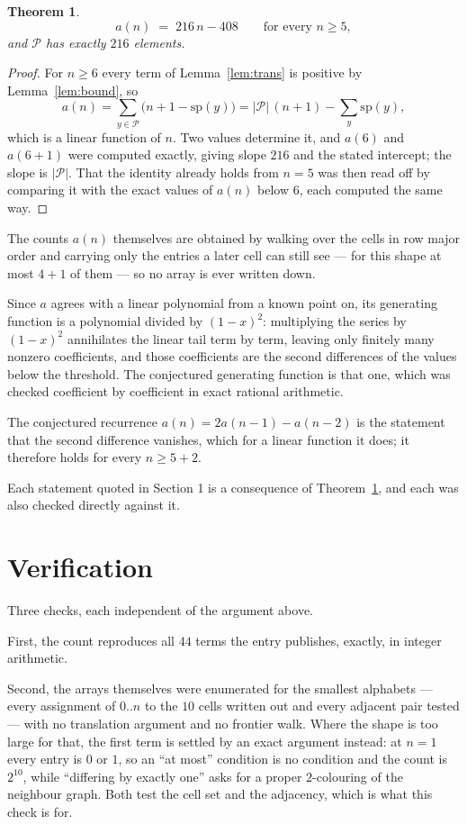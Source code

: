 \documentclass[11pt,a4paper]{article}
\theoremstyle{plain}
\newtheorem{theorem}{Theorem}
\theoremstyle{definition}
\begin{document}
\begin{theorem}\label{thm:line}
\[
a(n)\;=\;216\,n-408\qquad\text{for every }n\ge5,
\]
and $\mathcal P$ has exactly $216$ elements.
\end{theorem}

\begin{proof}
For $n\ge6$ every term of Lemma~\ref{lem:trans} is positive by
Lemma~\ref{lem:bound}, so
\[
a(n)=\sum_{y\in\mathcal P}\bigl(n+1-\mathrm{sp}(y)\bigr)
=|\mathcal P|\,(n+1)-\sum_{y}\mathrm{sp}(y),
\]
which is a linear function of $n$. Two values determine it, and $a(6)$ and
$a(6+1)$ were computed exactly, giving slope $216$ and the stated intercept; the slope
is $|\mathcal P|$. That the identity already holds from $n=5$ was then read off by
comparing it with the exact values of $a(n)$ below $6$, each computed the same way.
\end{proof}

The counts $a(n)$ themselves are obtained by walking over the cells in row major order and
carrying only the entries a later cell can still see --- for this shape at most $4+1$ of
them --- so no array is ever written down.

Since $a$ agrees with a linear polynomial from a known point on, its generating function is a
polynomial divided by $(1-x)^2$: multiplying the series by $(1-x)^2$ annihilates the linear
tail term by term, leaving only finitely many nonzero coefficients, and those coefficients are
the second differences of the values below the threshold. The conjectured generating function
is that one, which was checked coefficient by coefficient in exact rational arithmetic.

The conjectured recurrence $a(n)=2a(n-1)-a(n-2)$ is the statement that the second difference
vanishes, which for a linear function it does; it therefore holds for every $n\ge5+2$.

Each statement quoted in Section 1 is a consequence of Theorem~\ref{thm:line}, and each was
also checked directly against it.

\section{Verification}

Three checks, each independent of the argument above.

First, the count reproduces all $44$ terms the entry publishes, exactly, in integer
arithmetic.

Second, the arrays themselves were enumerated for the smallest alphabets --- every assignment
of $0..n$ to the $10$ cells written out and every adjacent pair tested --- with no
translation argument and no frontier walk. Where the shape is too large for that, the first
term is settled by an exact argument instead: at $n=1$ every entry is $0$ or $1$, so an ``at
most'' condition is no condition and the count is $2^{10}$, while ``differing by exactly
one'' asks for a proper $2$-colouring of the neighbour graph. Both test the cell set and the
adjacency, which is what this check is for.
\end{document}
